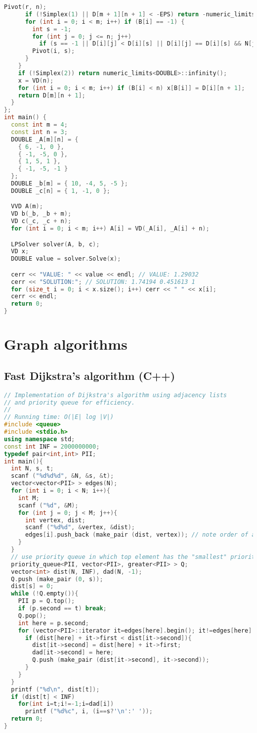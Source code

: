 \begin{lstlisting}[language=C++]
      Pivot(r, n);
      if (!Simplex(1) || D[m + 1][n + 1] < -EPS) return -numeric_limits<DOUBLE>::infinity();
      for (int i = 0; i < m; i++) if (B[i] == -1) {
        int s = -1;
        for (int j = 0; j <= n; j++)
          if (s == -1 || D[i][j] < D[i][s] || D[i][j] == D[i][s] && N[j] < N[s]) s = j;
        Pivot(i, s);
      }
    }
    if (!Simplex(2)) return numeric_limits<DOUBLE>::infinity();
    x = VD(n);
    for (int i = 0; i < m; i++) if (B[i] < n) x[B[i]] = D[i][n + 1];
    return D[m][n + 1];
  }
};
int main() {
  const int m = 4;
  const int n = 3;
  DOUBLE _A[m][n] = {
    { 6, -1, 0 },
    { -1, -5, 0 },
    { 1, 5, 1 },
    { -1, -5, -1 }
  };
  DOUBLE _b[m] = { 10, -4, 5, -5 };
  DOUBLE _c[n] = { 1, -1, 0 };

  VVD A(m);
  VD b(_b, _b + m);
  VD c(_c, _c + n);
  for (int i = 0; i < m; i++) A[i] = VD(_A[i], _A[i] + n);

  LPSolver solver(A, b, c);
  VD x;
  DOUBLE value = solver.Solve(x);

  cerr << "VALUE: " << value << endl; // VALUE: 1.29032
  cerr << "SOLUTION:"; // SOLUTION: 1.74194 0.451613 1
  for (size_t i = 0; i < x.size(); i++) cerr << " " << x[i];
  cerr << endl;
  return 0;
}
\end{lstlisting}
\section{Graph algorithms}
\subsection{Fast Dijkstra's algorithm (C++)}
\begin{lstlisting}[language=C++]
// Implementation of Dijkstra's algorithm using adjacency lists
// and priority queue for efficiency.
//
// Running time: O(|E| log |V|)
#include <queue>
#include <stdio.h>
using namespace std;
const int INF = 2000000000;
typedef pair<int,int> PII;
int main(){
  int N, s, t;
  scanf ("%d%d%d", &N, &s, &t);
  vector<vector<PII> > edges(N);
  for (int i = 0; i < N; i++){
    int M;
    scanf ("%d", &M);
    for (int j = 0; j < M; j++){
      int vertex, dist;
      scanf ("%d%d", &vertex, &dist);
      edges[i].push_back (make_pair (dist, vertex)); // note order of arguments here
    }
  }
  // use priority queue in which top element has the "smallest" priority
  priority_queue<PII, vector<PII>, greater<PII> > Q;
  vector<int> dist(N, INF), dad(N, -1);
  Q.push (make_pair (0, s));
  dist[s] = 0;
  while (!Q.empty()){
    PII p = Q.top();
    if (p.second == t) break;
    Q.pop();
    int here = p.second;
    for (vector<PII>::iterator it=edges[here].begin(); it!=edges[here].end(); it++){
      if (dist[here] + it->first < dist[it->second]){
        dist[it->second] = dist[here] + it->first;
        dad[it->second] = here;
        Q.push (make_pair (dist[it->second], it->second));
      }
    }
  }
  printf ("%d\n", dist[t]);
  if (dist[t] < INF)
    for(int i=t;i!=-1;i=dad[i])
      printf ("%d%c", i, (i==s?'\n':' '));
  return 0;
}
\end{lstlisting}
